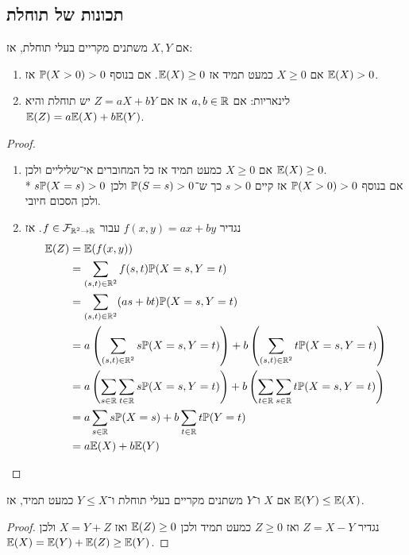 \subsection{תכונות של תוחלת}
\begin{proposition}
	אם $X, Y$ משתנים מקריים בעלי תוחלת, אז:
	\begin{enumerate}
		\item אם $X \ge 0$ כמעט תמיד אז $\mathbb{E}(X) \ge 0$.
			אם בנוסף $\mathbb{P}(X > 0) > 0$ אז $\mathbb{E}(X) > 0$.
		\item לינאריות: אם $a, b \in \mathbb{R}$ אז אם $Z = aX + bY$ יש תוחלת והיא $\mathbb{E}(Z) = a \mathbb{E}(X) + b \mathbb{E}(Y)$.
	\end{enumerate}
\end{proposition}
\begin{proof}
	\begin{enumerate}
		\item אם $X \ge 0$ כמעט תמיד אז כל המחוברים אי־שליליים ולכן $\mathbb{E}(X) \ge 0$. \\*
			אם בנוסף $\mathbb{P}(X > 0) > 0$ אז קיים $s > 0$ כך ש־$\mathbb{P}(S = s) > 0$ ולכן $s \mathbb{P}(X = s) > 0$ ולכן הסכום חיובי.
		\item נגדיר $f(x, y) = ax + by$ עבור $f \in \mathcal{F}_{\mathbb{R}^2 \to \mathbb{R}}$. אז
			\begin{align*}
				\mathbb{E}(Z)
				& = \mathbb{E}(f(x, y)) \\
				& = \sum_{(s, t) \in \mathbb{R}^2} f(s, t) \mathbb{P}(X = s, Y = t) \\
				& = \sum_{(s, t) \in \mathbb{R}^2} (as + bt) \mathbb{P}(X = s, Y = t) \\
				& = a \left(\sum_{(s, t) \in \mathbb{R}^2} s \mathbb{P}(X = s, Y = t)\right) + b \left(\sum_{(s, t) \in \mathbb{R}^2} t \mathbb{P}(X = s, Y = t)\right) \\
				& = a \left(\sum_{s \in \mathbb{R}} \sum_{t \in \mathbb{R}} s \mathbb{P}(X = s, Y = t)\right) + b \left(\sum_{t \in \mathbb{R}} \sum_{s \in \mathbb{R}} t \mathbb{P}(X = s, Y = t)\right) \\
				& = a \sum_{s \in \mathbb{R}} s \mathbb{P}(X = s) + b \sum_{t \in \mathbb{R}} t \mathbb{P}(Y = t) \\
				& = a \mathbb{E}(X) + b \mathbb{E}(Y)
			\end{align*}
	\end{enumerate}
\end{proof}
\begin{conclusion}
	אם $X$ ו־$Y$ משתנים מקריים בעלי תוחלת ו־$Y \le X$ כמעט תמיד, אז $\mathbb{E}(Y) \le \mathbb{E}(X)$.
\end{conclusion}
\begin{proof}
	נגדיר $Z = X - Y$ ואז $Z \ge 0$ כמעט תמיד ולכן $\mathbb{E}(Z) \ge 0$ ואז $X = Y + Z$ ולכן $\mathbb{E}(X) = \mathbb{E}(Y) + \mathbb{E}(Z) \ge \mathbb{E}(Y)$.
\end{proof}
